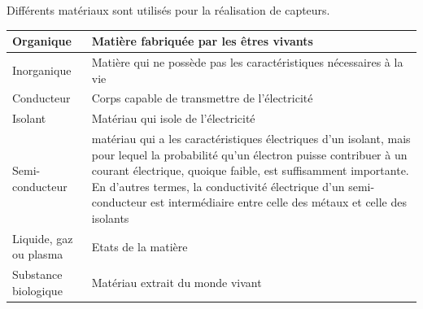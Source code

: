 \documentclass[main.tex]{subfiles}
\begin{document}
Différents matériaux sont utilisés pour la réalisation de capteurs.

\begin {center}
\begin{tabular}{|p{4.2cm}|p{9.5cm}|}
    \hline
    Organique              & Matière fabriquée par les êtres vivants                                                                                                                                                                                                                                                                                                 \\
    \hline
    Inorganique            & Matière qui ne possède pas les caractéristiques nécessaires à la vie                                                                                                                                                                                                                                                                    \\
    \hline
    Conducteur             & Corps capable de transmettre de l'électricité                                                                                                                                                                                                                                                                                           \\
    \hline
    Isolant                & Matériau qui isole de l'électricité                                                                                                                                                                                                                                                                                                     \\
    \hline
    Semi-conducteur        & matériau qui a les caractéristiques électriques d'un isolant, mais pour lequel la probabilité qu'un électron puisse contribuer à un courant électrique, quoique faible, est suffisamment importante. En d'autres termes, la conductivité électrique d'un semi-conducteur est intermédiaire entre celle des métaux et celle des isolants \\
    \hline
    Liquide, gaz ou plasma & Etats de la matière                                                                                                                                                                                                                                                                                                                     \\
    \hline
    Substance biologique   & Matériau extrait du monde vivant                                                                                                                                                                                                                                                                                                        \\
    \hline
\end{tabular}
\end{center}
\end{document}
